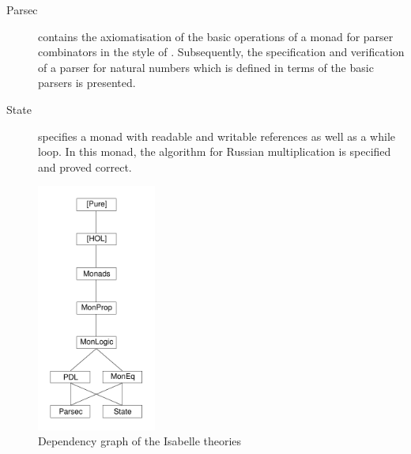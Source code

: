 \begin{description}
\item[Parsec] contains the axiomatisation of the basic operations of a monad for
  parser combinators in the style of \cite{HuttonMeijer96}. Subsequently, the
  specification and verification of a parser for natural numbers which is
  defined in terms of the basic parsers is presented. 

\item[State] specifies a monad with readable and writable references as well as
  a while loop. In this monad, the algorithm for Russian multiplication is
  specified and proved correct. 

\end{description}

\begin{figure}
  \centering
  \includegraphics[width=0.35\textwidth]{session_graph}
  \caption{Dependency graph of the Isabelle theories}
  \label{fig:session-graph}
\end{figure}

